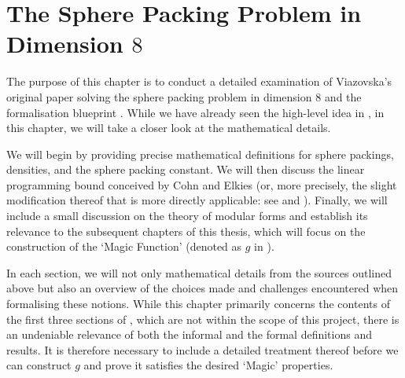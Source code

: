 \chapter{The Sphere Packing Problem in Dimension $8$}
\thispagestyle{empty}

The purpose of this chapter is to conduct a detailed examination of Viazovska's original paper solving the sphere packing problem in dimension $8$ \cite{Viazovska8} and the formalisation blueprint \cite{blueprint}. While we have already seen the high-level idea in , in this chapter, we will take a closer look at the mathematical details.

We will begin by providing precise mathematical definitions for sphere packings, densities, and the sphere packing constant. We will then discuss the linear programming bound conceived by Cohn and Elkies \cite[Theorem 3.1]{CohnElkies} (or, more precisely, the slight modification thereof that is more directly applicable: see \cite[Theorem 2]{Viazovska8} and \cite[Theorem 5.1]{blueprint}). Finally, we will include a small discussion on the theory of modular forms and establish its relevance to the subsequent chapters of this thesis, which will focus on the construction of the `Magic Function' (denoted as $g$ in \cite[Theorem 3]{Viazovska8}).

In each section, we will not only mathematical details from the sources outlined above but also an overview of the choices made and challenges encountered when formalising these notions. While this chapter primarily concerns the contents of the first three sections of \cite{Viazovska8}, which are not within the scope of this project, there is an undeniable relevance of both the informal and the formal definitions and results. It is therefore necessary to include a detailed treatment thereof before we can construct $g$ and prove it satisfies the desired `Magic' properties.



